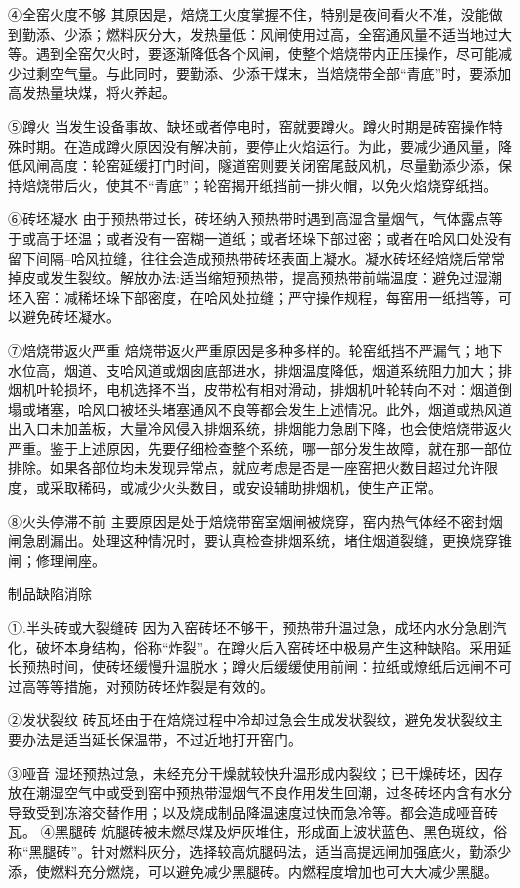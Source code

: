 \documentclass{ctexbook}
\begin{document}
④全窑火度不够 其原因是，焙烧工火度掌握不住，特别是夜间看火不准，没能做到勤添、少添；燃料灰分大，发热量低：风闸使用过高，全窑通风量不适当地过大等。遇到全窑欠火时，要逐渐降低各个风闸，使整个焙烧带内正压操作，尽可能减少过剩空气量。与此同时，要勤添、少添干煤末，当焙烧带全部“青底”时，要添加高发热量块煤，将火养起。

⑤蹲火 当发生设备事故、缺坯或者停电时，窑就要蹲火。蹲火时期是砖窑操作特殊时期。在造成蹲火原因没有解决前，要停止火焰运行。为此，要减少通风量，降低风闸高度：轮窑延缓打门时间，隧道窑则要关闭窑尾鼓风机，尽量勤添少添，保持焙烧带后火，使其不“青底”；轮窑揭开纸挡前一排火帽，以免火焰烧穿纸挡。

⑥砖坯凝水 由于预热带过长，砖坯纳入预热带时遇到高湿含量烟气，气体露点等于或高于坯温；或者没有一窑糊一道纸；或者坯垛下部过密；或者在哈风口处没有留下间隔--哈风拉缝，往往会造成预热带砖坯表面上凝水。凝水砖坯经焙烧后常常掉皮或发生裂纹。解放办法:适当缩短预热带，提高预热带前端温度：避免过湿潮坯入窑：减稀坯垛下部密度，在哈风处拉缝；严守操作规程，每窑用一纸挡等，可以避免砖坯凝水。

⑦焙烧带返火严重 焙烧带返火严重原因是多种多样的。轮窑纸挡不严漏气；地下水位高，烟道、支哈风道或烟囱底部进水，排烟温度降低，烟道系统阻力加大；排烟机叶轮损坏，电机选择不当，皮带松有相对滑动，排烟机叶轮转向不对：烟道倒塌或堵塞，哈风口被坯头堵塞通风不良等都会发生上述情况。此外，烟道或热风道出入口未加盖板，大量冷风侵入排烟系统，排烟能力急剧下降，也会使焙烧带返火严重。鉴于上述原因，先要仔细检查整个系统，哪一部分发生故障，就在那一部位排除。如果各部位均未发现异常点，就应考虑是否是一座窑把火数目超过允许限度，或采取稀码，或减少火头数目，或安设辅助排烟机，使生产正常。

⑧火头停滞不前 主要原因是处于焙烧带窑室烟闸被烧穿，窑内热气体经不密封烟闸急剧漏出。处理这种情况时，要认真检查排烟系统，堵住烟道裂缝，更换烧穿锥闸；修理闸座。

制品缺陷消除

①.半头砖或大裂缝砖 因为入窑砖坯不够干，预热带升温过急，成坯内水分急剧汽化，破坏本身结构，俗称“炸裂”。在蹲火后入窑砖坯中极易产生这种缺陷。采用延长预热时间，使砖坯缓慢升温脱水；蹲火后缓缓使用前闸：拉纸或燎纸后远闸不可过高等等措施，对预防砖坯炸裂是有效的。

②发状裂纹 砖瓦坯由于在焙烧过程中冷却过急会生成发状裂纹，避免发状裂纹主要办法是适当延长保温带，不过近地打开窑门。

③哑音 湿坯预热过急，未经充分干燥就较快升温形成内裂纹；已干燥砖坯，因存放在潮湿空气中或受到窑中预热带湿烟气不良作用发生回潮，过冬砖坯内含有水分导致受到冻溶交替作用；以及烧成制品降温速度过快而急冷等。都会造成哑音砖瓦。
④黑腿砖 炕腿砖被未燃尽煤及炉灰堆住，形成面上波状蓝色、黑色斑纹，俗称“黑腿砖”。针对燃料灰分，选择较高炕腿码法，适当高提远闸加强底火，勤添少添，使燃料充分燃烧，可以避免减少黑腿砖。内燃程度增加也可大大减少黑腿。
\end{document}
